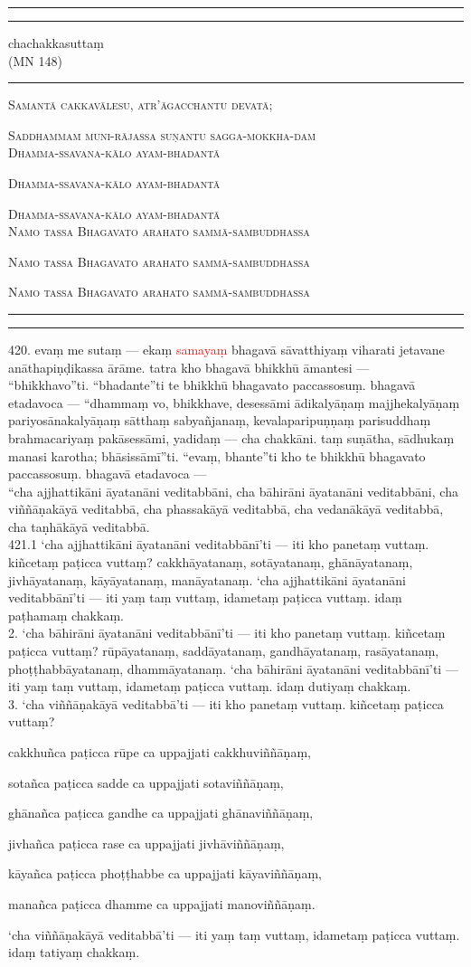 \documentclass[10pt]{article}
\newcommand*{\titlePaliSuttaTitlePage}{\begingroup %
\newlength{\drop} %
\drop=0.1\textheight %

\rule{\textwidth}{1pt}\par %
\vspace{2pt}\vspace{-\baselineskip} %
\rule{\textwidth}{0.4pt}\par %

\vspace{\drop} %
\centering %

{\Huge chachakkasuttaṃ}\\[1\baselineskip] %
{\large (MN 148)}

\vspace{0.25\drop} %
\rule{0.3\textwidth}{0.4pt}\par %
\vspace{\drop} %

{\large\textsc{Samantā cakkavālesu, atr'āgacchantu devatā;}}\par
{\large\textsc{Saddhammaṁ muni-rājassa suṇantu sagga-mokkha-daṁ}}\\[2\baselineskip]


{\large\textsc{Dhamma-ssavana-kālo  ayam-bhadantā}}\par
{\large\textsc{Dhamma-ssavana-kālo  ayam-bhadantā}}\par
{\large\textsc{Dhamma-ssavana-kālo  ayam-bhadantā}}\\[2\baselineskip]


{\large \textsc{Namo tassa Bhagavato arahato sammā-sambuddhassa}}\par %
{\large \textsc{Namo tassa Bhagavato arahato sammā-sambuddhassa}}\par %
{\large \textsc{Namo tassa Bhagavato arahato sammā-sambuddhassa}}\par %
\vspace*{\drop} %

\rule{\textwidth}{0.4pt}\par %
\vspace{2pt}\vspace{-\baselineskip} %
\rule{\textwidth}{1pt}\par %
\pagebreak
\endgroup}
\newcommand{\nom}[1]{\textcolor{red}{#1}}
\begin{document}
\titlePaliSuttaTitlePage
 
420. evaṃ me sutaṃ — ekaṃ \nom{samayaṃ} bhagavā sāvatthiyaṃ viharati jetavane anāthapiṇḍikassa ārāme. tatra kho bhagavā bhikkhū āmantesi —\\

“bhikkhavo”ti. “bhadante”ti te bhikkhū bhagavato paccassosuṃ. bhagavā etadavoca — “dhammaṃ vo, bhikkhave, desessāmi ādikalyāṇaṃ majjhekalyāṇaṃ pariyosānakalyāṇaṃ sātthaṃ sabyañjanaṃ, kevalaparipuṇṇaṃ parisuddhaṃ brahmacariyaṃ pakāsessāmi, yadidaṃ — cha chakkāni. taṃ suṇātha, sādhukaṃ manasi karotha; bhāsissāmī”ti. “evaṃ, bhante”ti kho te bhikkhū bhagavato paccassosuṃ. bhagavā etadavoca —\\

“cha ajjhattikāni āyatanāni veditabbāni, cha bāhirāni āyatanāni veditabbāni, cha viññāṇakāyā veditabbā, cha phassakāyā veditabbā, cha vedanākāyā veditabbā, cha taṇhākāyā veditabbā.\\

421.1 ‘cha ajjhattikāni āyatanāni veditabbānī’ti — iti kho panetaṃ vuttaṃ. kiñcetaṃ paṭicca vuttaṃ? cakkhāyatanaṃ, sotāyatanaṃ, ghānāyatanaṃ, jivhāyatanaṃ, kāyāyatanaṃ, manāyatanaṃ. ‘cha ajjhattikāni āyatanāni veditabbānī’ti — iti yaṃ taṃ vuttaṃ, idametaṃ paṭicca vuttaṃ. idaṃ paṭhamaṃ chakkaṃ.\\

2. ‘cha bāhirāni āyatanāni veditabbānī’ti — iti kho panetaṃ vuttaṃ. kiñcetaṃ paṭicca vuttaṃ? rūpāyatanaṃ, saddāyatanaṃ, gandhāyatanaṃ, rasāyatanaṃ, phoṭṭhabbāyatanaṃ, dhammāyatanaṃ. ‘cha bāhirāni āyatanāni veditabbānī’ti — iti yaṃ taṃ vuttaṃ, idametaṃ paṭicca vuttaṃ. idaṃ dutiyaṃ chakkaṃ.\\

3. ‘cha viññāṇakāyā veditabbā’ti — iti kho panetaṃ vuttaṃ. kiñcetaṃ paṭicca vuttaṃ?\

cakkhuñca paṭicca rūpe ca uppajjati cakkhuviññāṇaṃ,\

sotañca paṭicca sadde ca uppajjati sotaviññāṇaṃ,\

ghānañca paṭicca gandhe ca uppajjati ghānaviññāṇaṃ,\

jivhañca paṭicca rase ca uppajjati jivhāviññāṇaṃ,\

kāyañca paṭicca phoṭṭhabbe ca uppajjati kāyaviññāṇaṃ,\

manañca paṭicca dhamme ca uppajjati manoviññāṇaṃ.\

‘cha viññāṇakāyā veditabbā’ti — iti yaṃ taṃ vuttaṃ, idametaṃ paṭicca vuttaṃ. idaṃ tatiyaṃ chakkaṃ.\\
\end{document}
